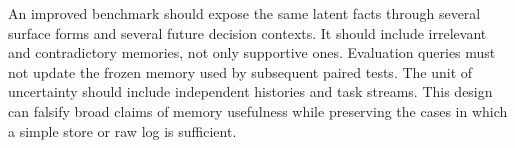 An improved benchmark should expose the same latent facts through several surface forms and several future decision contexts. It should include irrelevant and contradictory memories, not only supportive ones. Evaluation queries must not update the frozen memory used by subsequent paired tests. The unit of uncertainty should include independent histories and task streams. This design can falsify broad claims of memory usefulness while preserving the cases in which a simple store or raw log is sufficient.

